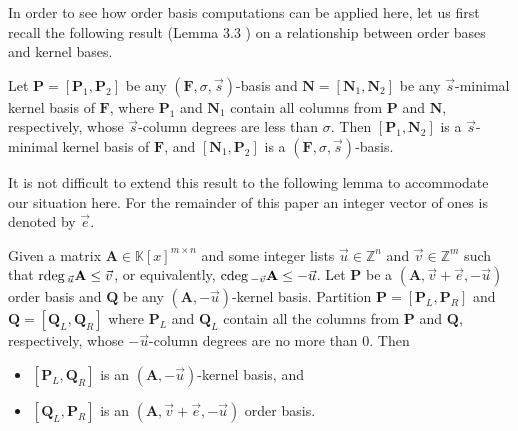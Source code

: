 In order to see how order basis computations can be applied here,
let us first recall the following result (Lemma 3.3 \cite{za2012})
on a relationship between order bases and kernel bases.
\begin{lem}
\label{lem:orderBasisContainsNullspaceBasis}Let $\mathbf{P}=\left[\mathbf{P}_{1},\mathbf{P}_{2}\right]$
be any $\left(\mathbf{F},\sigma,\vec{s}\right)$-basis and $\mathbf{N}=\left[\mathbf{N}_{1},\mathbf{N}_{2}\right]$
be any $\vec{s}$-minimal kernel basis of $\mathbf{F}$, where $\mathbf{P}_{1}$
and $\mathbf{N}_{1}$ contain all columns from $\mathbf{P}$ and $\mathbf{N}$,
respectively, whose $\vec{s}$-column degrees are less than $\sigma$.
Then $\left[\mathbf{P}_{1},\mathbf{N}_{2}\right]$ is a $\vec{s}$-minimal
kernel basis of $\mathbf{F}$, and $\left[\mathbf{N}_{1},\mathbf{P}_{2}\right]$
is a $\left(\mathbf{F},\sigma,\vec{s}\right)$-basis.
\end{lem}
It is not difficult to extend this result to the following lemma to
accommodate our situation here. For the remainder of this paper an
integer vector of ones is denoted by $\vec{e}$. 
\begin{lem}
\label{lem:orderbasisContainsKernelbasisGeneralized} Given a matrix
$\mathbf{A}\in\mathbb{K}\left[x\right]^{m\times n}$ and some integer
lists $\vec{u}\in\mathbb{Z}^{n}$ and $\vec{v}\in\mathbb{Z}^{m}$
such that ${\rm rdeg}\,_{\vec{u}}\mathbf{A}\le\vec{v}$, or equivalently,
${\rm cdeg}\,_{-\vec{v}}\mathbf{A}\le-\vec{u}$. Let $\mathbf{P}$ be a $\left(\mathbf{A},\vec{v}+\vec{e},-\vec{u}\right)$
order basis and $\mathbf{Q}$ be any $(\mathbf{A},-\vec{u})$-kernel
basis. Partition $\mathbf{P}=\left[\mathbf{P}_{L},\mathbf{P}_{R}\right]$
and $\mathbf{Q}=\left[\mathbf{Q}_{L},\mathbf{Q}_{R}\right]$ where
$\mathbf{P}_{L}$ and $\mathbf{Q}_{L}$ contain all the columns from
$\mathbf{P}$ and $\mathbf{Q}$, respectively, whose $-\vec{u}$-column
degrees are no more than $0$. Then 
\begin{itemize}
\item $\left[\mathbf{P}_{L},\mathbf{Q}_{R}\right]$ is an $(\mathbf{A},-\vec{u})$-kernel
basis, and 
\item $\left[\mathbf{Q}_{L},\mathbf{P}_{R}\right]$ is an $\left(\mathbf{A},\vec{v}+\vec{e},-\vec{u}\right)$
order basis. 
\end{itemize}
\end{lem}
